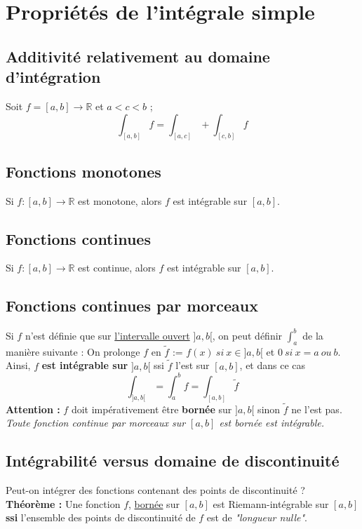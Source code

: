 \documentclass[11pt, a4paper, openany]{book}
\begin{document}
\section{Propriétés de l'intégrale simple}
\subsection{Additivité relativement au domaine d'intégration}
Soit $f = [a,b] \rightarrow \mathbb{R}$ et $a < c < b$ ;
$$\int_{[a,b]} f = \int_{[a,c]} + \int_{[c,b]} f$$

\subsection{Fonctions monotones}
Si $f : [a,b] \rightarrow \mathbb{R}$ est monotone, alors $f$ est intégrable sur $[a,b]$.

\subsection{Fonctions continues}
Si $f : [a,b] \rightarrow \mathbb{R}$ est continue, alors $f$ est intégrable sur $[a,b]$.

\subsection{Fonctions continues par morceaux}
Si $f$ n'est définie que sur \underline{l'intervalle ouvert} $]a,b[$, on peut définir $\int_a^b$ de la manière suivante : On prolonge $f$ en $\tilde{f}$ := $f(x)\ si\ x \in ]a,b[$ et $0\ si\ x = a\ ou\ b$.\\

Ainsi, $f$ \textbf{est intégrable sur} $]a,b[$ ssi $\tilde{f}$ l'est sur $[a,b]$, et dans ce cas
$$\int_{]a,b[} = \int_a^b f = \int_{[a,b]} \tilde{f}$$
\textbf{Attention :} $f$ doit impérativement être \textbf{bornée} sur $]a,b[$ sinon $\tilde{f}$ ne l'est pas.\\

\textit{Toute fonction continue par morceaux sur $[a,b]$ est bornée est intégrable.}

\subsection{Intégrabilité versus domaine de discontinuité}
Peut-on intégrer des fonctions contenant des points de discontinuité ? \\

\textbf{Théorème :} Une fonction $f$, \underline{bornée} sur $[a,b]$ est Riemann-intégrable sur $[a,b]$ \textbf{ssi} l'ensemble des points de discontinuité de $f$ est de \textit{"longueur nulle"}.
\end{document}
